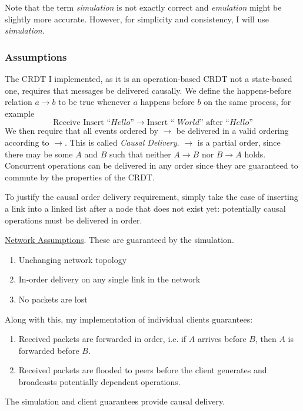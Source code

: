 \documentclass[12pt,a4paper,twoside,openright]{report}
\begin{document}
		Note that the term \textit{simulation} is not exactly correct and \textit{emulation} might be slightly more accurate. However, for simplicity and consistency, I will use \textit{simulation}.
		
		\subsubsection{Assumptions} \label{sec:networkassumptions}
		The CRDT I implemented, as it is an operation-based CRDT not a state-based one, requires that messages be delivered causally. We define the happens-before relation \(a \rightarrow b\) to be true whenever $a$ happens before $b$ on the same process, for example \[\text{Receive Insert ``} Hello \text{''} \rightarrow \text{Insert `` } World \text{'' after ``} Hello \text{''}\]
		We then require that all events ordered by $\rightarrow$ be delivered in a valid ordering according to $\rightarrow$. This is called \textit{Causal Delivery}. $\rightarrow$ is a partial order, since there may be some $A$ and $B$ such that neither $A \rightarrow B$ nor $B \rightarrow A$ holds. Concurrent operations can be delivered in any order since they are guaranteed to commute by the properties of the CRDT.
		
		To justify the causal order delivery requirement, simply take the case of inserting a link into a linked list after a node that does not exist yet: potentially causal operations must be delivered in order. 
		
		\underline{Network Assumptions}. These are guaranteed by the simulation.
		\begin{enumerate}
			\item Unchanging network topology
			\item In-order delivery on any single link in the network
			\item No packets are lost
		\end{enumerate}
		
		Along with this, my implementation of individual clients guarantees:
		\begin{enumerate}
			\item Received packets are forwarded in order, i.e. if $A$ arrives before $B$, then $A$ is forwarded before $B$.
			\item Received packets are flooded to peers before the client generates and broadcasts potentially dependent operations.
		\end{enumerate} 
		
		The simulation and client guarantees provide causal delivery.
		
\end{document}
